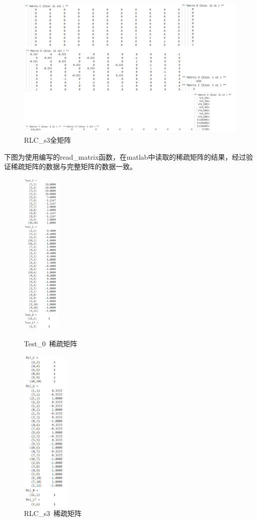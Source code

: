 \documentclass[12pt]{article}
\begin{document}
\begin{figure}[H]
  \centering
  \includegraphics[width=15cm]{figure/RLC_full.png}
  \caption{RLC\_s3全矩阵}
\end{figure}
\qquad 下图为使用编写的read\_matrix函数，在matlab中读取的稀疏矩阵的结果，经过验证稀疏矩阵的数据与完整矩阵的数据一致。\par
\begin{figure}[H]
  \begin{minipage}{0.49\linewidth}
    \centering
    \includegraphics[height=8cm]{figure/Test_sparse.png}
    \caption{Test\_0\ 稀疏矩阵}
  \end{minipage}
  \begin{minipage}{0.49\linewidth}
    \centering
    \includegraphics[height=8cm]{figure/RLC_sparse.png}
    \caption{RLC\_s3\ 稀疏矩阵}
  \end{minipage}
\end{figure}
\end{document}

